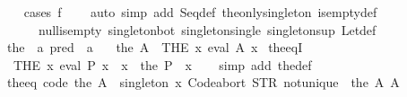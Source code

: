 \begin{isabellebody}
%
\isadelimproof
\ \ %
\endisadelimproof
%
\isatagproof
{}\isamarkupfalse%
\ {\isacharparenleft}{\kern0pt}cases\ {\isachardoublequoteopen}f\ {\isacharparenleft}{\kern0pt}{\isacharparenright}{\kern0pt}{\isachardoublequoteclose}{\isacharparenright}{\kern0pt}\isanewline
\ \ \ {\isacharparenleft}{\kern0pt}auto\ simp\ add{\isacharcolon}{\kern0pt}\ Seq{\isacharunderscore}{\kern0pt}def\ the{\isacharunderscore}{\kern0pt}only{\isacharunderscore}{\kern0pt}singleton\ is{\isacharunderscore}{\kern0pt}empty{\isacharunderscore}{\kern0pt}def\isanewline
\ \ \ \ \ \ null{\isacharunderscore}{\kern0pt}is{\isacharunderscore}{\kern0pt}empty\ singleton{\isacharunderscore}{\kern0pt}bot\ singleton{\isacharunderscore}{\kern0pt}single\ singleton{\isacharunderscore}{\kern0pt}sup\ Let{\isacharunderscore}{\kern0pt}def{\isacharparenright}{\kern0pt}%
\endisatagproof
{\isafoldproof}%
%
\isadelimproof
\isanewline
%
\endisadelimproof
\isanewline
{}\isamarkupfalse%
\ the\ {\isacharcolon}{\kern0pt}{\isacharcolon}{\kern0pt}\ {\isachardoublequoteopen}{\isacharprime}{\kern0pt}a\ pred\ {\isasymRightarrow}\ {\isacharprime}{\kern0pt}a{\isachardoublequoteclose}\ \isanewline
\ \ {\isachardoublequoteopen}the\ A\ {\isacharequal}{\kern0pt}\ {\isacharparenleft}{\kern0pt}THE\ x{\isachardot}{\kern0pt}\ eval\ A\ x{\isacharparenright}{\kern0pt}{\isachardoublequoteclose}\isanewline
\isanewline
{}\isamarkupfalse%
\ the{\isacharunderscore}{\kern0pt}eqI{\isacharcolon}{\kern0pt}\isanewline
\ \ {\isachardoublequoteopen}{\isacharparenleft}{\kern0pt}THE\ x{\isachardot}{\kern0pt}\ eval\ P\ x{\isacharparenright}{\kern0pt}\ {\isacharequal}{\kern0pt}\ x\ {\isasymLongrightarrow}\ the\ P\ {\isacharequal}{\kern0pt}\ x{\isachardoublequoteclose}\isanewline
%
\isadelimproof
\ \ %
\endisadelimproof
%
\isatagproof
{}\isamarkupfalse%
\ {\isacharparenleft}{\kern0pt}simp\ add{\isacharcolon}{\kern0pt}\ the{\isacharunderscore}{\kern0pt}def{\isacharparenright}{\kern0pt}%
\endisatagproof
{\isafoldproof}%
%
\isadelimproof
\isanewline
%
\endisadelimproof
\isanewline
{}\isamarkupfalse%
\ the{\isacharunderscore}{\kern0pt}eq\ {\isacharbrackleft}{\kern0pt}code{\isacharbrackright}{\kern0pt}{\isacharcolon}{\kern0pt}\ {\isachardoublequoteopen}the\ A\ {\isacharequal}{\kern0pt}\ singleton\ {\isacharparenleft}{\kern0pt}{\isasymlambda}x{\isachardot}{\kern0pt}\ Code{\isachardot}{\kern0pt}abort\ {\isacharparenleft}{\kern0pt}STR\ {\isacharprime}{\kern0pt}{\isacharprime}{\kern0pt}not{\isacharunderscore}{\kern0pt}unique{\isacharprime}{\kern0pt}{\isacharprime}{\kern0pt}{\isacharparenright}{\kern0pt}\ {\isacharparenleft}{\kern0pt}{\isasymlambda}{\isacharunderscore}{\kern0pt}{\isachardot}{\kern0pt}\ the\ A{\isacharparenright}{\kern0pt}{\isacharparenright}{\kern0pt}\ A{\isachardoublequoteclose}\isanewline

\end{isabellebody}
